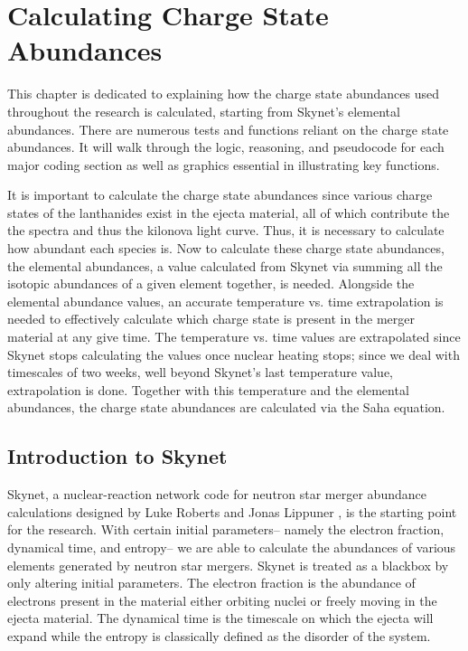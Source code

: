\documentclass[11pt,a4paper]{article}
\begin{document}
\section{Calculating Charge State Abundances}

This chapter is dedicated to explaining how the charge state abundances used throughout the research is calculated, starting from Skynet’s elemental abundances. There are numerous tests and functions reliant on the charge state abundances. It will walk through the logic, reasoning, and pseudocode for each major coding section as well as graphics essential in illustrating key functions. 

It is important to calculate the charge state abundances since various charge states of the lanthanides exist in the ejecta material, all of which contribute the the spectra and thus the kilonova light curve. Thus, it is necessary to calculate how abundant each species is. Now to calculate these charge state abundances, the elemental abundances, a value calculated from Skynet via summing all the isotopic abundances of a given element together, is needed. Alongside the elemental abundance values, an accurate temperature vs. time extrapolation is needed to effectively calculate which charge state is present in the merger material at any give time. The temperature vs. time values are extrapolated since Skynet stops calculating the values once nuclear heating stops; since we deal with timescales of two weeks, well beyond Skynet's last temperature value, extrapolation is done. Together with this temperature and the elemental abundances, the charge state abundances are calculated via the Saha equation. 

\subsection{Introduction to Skynet}

Skynet, a nuclear-reaction network code for neutron star merger abundance calculations designed by Luke Roberts and Jonas Lippuner \cite{Roberts_2017} , is the starting point for the research. With certain initial parameters-- namely the electron fraction, dynamical time, and entropy-- we are able to calculate the abundances of various elements generated by neutron star mergers. Skynet is treated as a blackbox by only altering initial parameters. The electron fraction is the abundance of electrons present in the material either orbiting nuclei or freely moving in the ejecta material. The dynamical time is the timescale on which the ejecta will expand while the entropy is classically defined as the disorder of the system.
\end{document}
